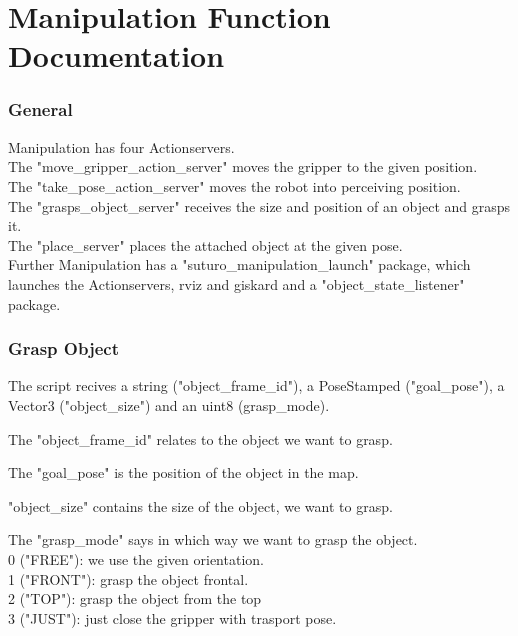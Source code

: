 \documentclass[main.tex]{subfiles}
\begin{document}
	\begingroup

	\renewcommand{\cleardoublepage}{}

	\renewcommand{\clearpage}{}

	\chapter{Manipulation Function Documentation}


		
		\subsection{General}

		Manipulation has four Actionservers.\\
		The "move\_gripper\_action\_server" moves the gripper to the given position.\\
		The "take\_pose\_action\_server" moves the robot into perceiving position.\\
		The "grasps\_object\_server" receives the size and position of an object and grasps it.\\
		The "place\_server" places the attached object at the given pose.\\
		Further Manipulation has a "suturo\_manipulation\_launch" package, which launches the Actionservers, rviz and giskard and a "object\_state\_listener" package.

		\subsection{Grasp Object}
			The script recives a string ("object\_frame\_id"), a PoseStamped ("goal\_pose"), a Vector3 ("object\_size") and an uint8 (grasp\_mode).
			
			\vspace{0,25 cm}
			The "object\_frame\_id" relates to the object we want to grasp.
		
			\vspace{0,25 cm}
			The "goal\_pose" is the position of the object in the map.

			\vspace{0,25 cm}
			"object\_size" contains the size of the object, we want to grasp.
			
			\vspace{0,25 cm}
			The "grasp\_mode" says in which way we want to grasp the object. \\ 
			0 ("FREE"): we use the given orientation.\\
			 1 ("FRONT"): grasp the object frontal.\\
			 2 ("TOP"): grasp the object from the top\\
			 3 ("JUST"): just close the gripper with trasport pose.
			 
\end{document}
